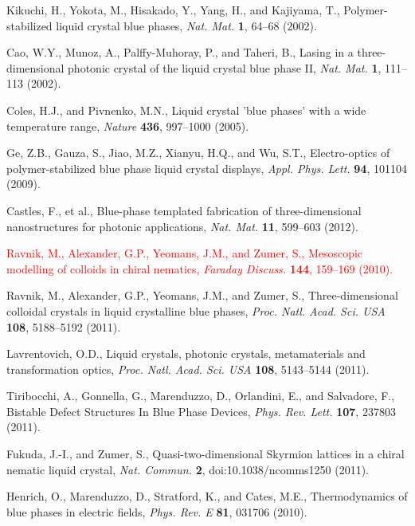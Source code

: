 \documentclass[12pt]{article}
\begin{document}
\begin{thebibliography}{99}
Kikuchi, H., Yokota, M., Hisakado, Y., Yang, H., and Kajiyama, T.,
Polymer-stabilized liquid crystal blue phases,
{\it Nat. Mat.} {\bf 1}, 64--68 (2002).

Cao, W.Y., Munoz, A., Palffy-Muhoray, P., and  Taheri, B.,
Lasing in a three-dimensional photonic crystal of the liquid crystal blue 
phase II,
{\it Nat. Mat.} {\bf 1}, 111--113 (2002).

Coles, H.J., and  Pivnenko, M.N.,
Liquid crystal 'blue phases' with a wide temperature range,
{\it Nature} {\bf 436}, 997--1000 (2005).

Ge, Z.B., Gauza, S., Jiao, M.Z., Xianyu, H.Q., and  Wu, S.T.,
 Electro-optics of polymer-stabilized blue phase liquid crystal displays,
{\it Appl. Phys. Lett.} {\bf 94}, 101104 (2009).

Castles, F., et al.,
Blue-phase templated fabrication of three-dimensional nanostructures for
photonic applications, {\it Nat. Mat.} {\bf 11}, 599--603 (2012).

\textcolor{red}{Ravnik, M., Alexander, G.P., Yeomans, J.M., and Zumer, S.,
Mesoscopic modelling of colloids in chiral nematics,
{\it Faraday Discuss.} {\bf 144}, 159--169 (2010).}

Ravnik, M., Alexander, G.P.,  Yeomans, J.M., and  Zumer, S.,
Three-dimensional colloidal crystals in liquid crystalline 
blue phases, {\it Proc. Natl. Acad. Sci. USA} {\bf 108}, 5188--5192 (2011).

 Lavrentovich, O.D.,
 Liquid crystals, photonic crystals, metamaterials and transformation optics, 
{\it Proc. Natl. Acad. Sci. USA} {\bf 108}, 5143--5144 (2011).

Tiribocchi, A., Gonnella, G., Marenduzzo, D., Orlandini, E., and Salvadore, F.,
Bistable Defect Structures In Blue Phase Devices,
 {\it Phys. Rev. Lett.} {\bf 107}, 237803 (2011).

Fukuda, J.-I., and Zumer, S.,
Quasi-two-dimensional Skyrmion lattices in a chiral nematic liquid crystal,
{\it Nat. Commun.} {\bf 2}, doi:10.1038/ncomms1250 (2011).

Henrich, O., Marenduzzo, D., Stratford, K., and  Cates, M.E.,
Thermodynamics of blue phases in electric fields,
{\it Phys. Rev. E} {\bf 81}, 031706 (2010).


\end{thebibliography}
\end{document}
